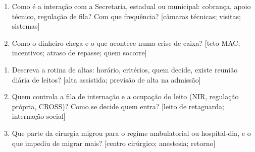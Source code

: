\begin{enumerate}[itemsep=2pt]
  \item Como é a interação com a Secretaria, estadual ou municipal: cobrança, apoio técnico, regulação de fila? Com que frequência? [câmaras técnicas; visitas; sistemas]
  \par\nopagebreak{}
  \item Como o dinheiro chega e o que acontece numa crise de caixa? [teto MAC; incentivos; atraso de repasse; quem socorre]
  \par\nopagebreak{}
\end{enumerate}

\begin{enumerate}[itemsep=2pt]
  \item Descreva a rotina de altas: horário, critérios, quem decide, existe reunião diária de leitos? [alta assistida; previsão de alta na admissão]
  \par\nopagebreak{}
  \item Quem controla a fila de internação e a ocupação do leito (NIR, regulação própria, CROSS)? Como se decide quem entra? [leito de retaguarda; internação social]
  \par\nopagebreak{}
  \item Que parte da cirurgia migrou para o regime ambulatorial ou hospital-dia, e o que impediu de migrar mais? [centro cirúrgico; anestesia; retorno]
  \par\nopagebreak{}
\end{enumerate}

